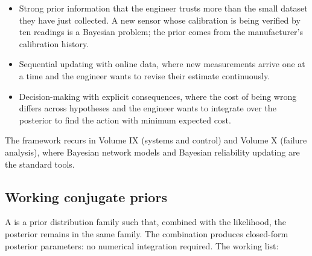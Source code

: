 \begin{itemize}[leftmargin=*]
  \item Strong prior information that the engineer trusts more than
    the small dataset they have just collected. A new sensor whose
    calibration is being verified by ten readings is a Bayesian
    problem; the prior comes from the manufacturer's calibration
    history.
  \item Sequential updating with online data, where new measurements
    arrive one at a time and the engineer wants to revise their
    estimate continuously.
  \item Decision-making with explicit consequences, where the cost
    of being wrong differs across hypotheses and the engineer wants
    to integrate over the posterior to find the action with minimum
    expected cost.
\end{itemize}

The framework recurs in Volume IX (systems and control) and Volume
X (failure analysis), where Bayesian network models and Bayesian
reliability updating are the standard tools.

\subsection{Working conjugate priors}

A  is a prior distribution family such
that, combined with the likelihood, the posterior remains in the
same family. The combination produces closed-form posterior
parameters: no numerical integration required. The working list:

